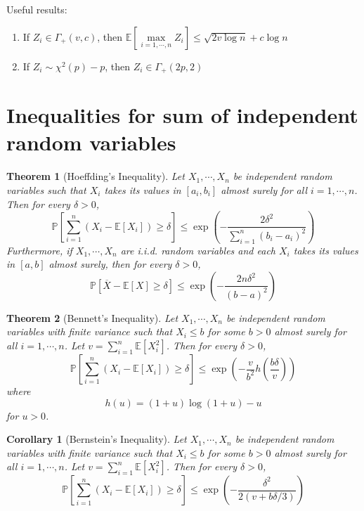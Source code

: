 \documentclass[10pt]{article}
\newcounter{lecnum}
\newtheorem{theorem}{Theorem}[lecnum]
\newtheorem{corollary}[cor]{Corollary}
\newcommand{\Expect}[1]{\mathbb{E}\!\left[#1\right]}
\renewcommand{\P}[1]{\mathbb{P}\!\left[#1\right]}
\renewcommand{\bar}{\overline}
\begin{document}
Useful results:
\begin{enumerate}
\item If $Z_i \in \Gamma_{+}(v, c)$, then $\Expect{\max\limits_{i=1, \cdots, n}Z_i} \le \sqrt{2v \log{n}} + c\log{n}$
\item If $Z_i \sim \chi^2(p) - p$, then $Z_i \in \Gamma_{+}(2p, 2)$
\end{enumerate}

\section{Inequalities for sum of independent random variables}

\begin{theorem}[Hoeffding's Inequality]
Let $X_1, \cdots, X_n$ be independent random variables such that $X_i$ takes its values in $[a_i, b_i]$
almost surely for all $i=1, \cdots, n$. Then for every $\delta > 0$,
\begin{equation}
\P{\sum_{i=1}^{n} (X_i - \Expect{X_i}) \ge \delta} \le \exp{(- \frac{2 \delta^2}{\sum_{i=1}^{n} (b_i - a_i)^2})} 
\end{equation}
Furthermore, if $X_1, \cdots, X_n$ are i.i.d. random variables and each $X_i$ takes its values in $[a, b]$
almost surely, then for every $\delta > 0$,
\begin{equation}
\label{equ:Hoeffding2}
\P{\bar{X} - \Expect{X} \ge \delta} \le \exp{(- \frac{2 n \delta^2}{(b - a)^2})}
\end{equation}
\end{theorem}


\begin{theorem}[Bennett's Inequality]
Let $X_1, \cdots, X_n$ be independent random variables with finite variance 
such that $X_i \le b$ for some $b > 0$
almost surely for all $i=1, \cdots, n$. 
Let $ v = \sum_{i=1}^{n} \Expect{X_i^2}$.
Then for every $\delta > 0$,
\begin{equation}
\P{\sum_{i=1}^{n} (X_i - \Expect{X_i}) \ge \delta} \le \exp{(- \frac{v}{b^2} h(\frac{b\delta}{v}))} 
\end{equation}
where
\begin{equation}
h(u) = (1+u) \log{(1+u)} -u
\end{equation}
for $u > 0$.
\end{theorem}

\begin{corollary}[Bernstein's Inequality]
Let $X_1, \cdots, X_n$ be independent random variables with finite variance 
such that $X_i \le b$ for some $b > 0$
almost surely for all $i=1, \cdots, n$. 
Let $ v = \sum_{i=1}^{n} \Expect{X_i^2}$.
Then for every $\delta > 0$,
\begin{equation}
\P{\sum_{i=1}^{n} (X_i - \Expect{X_i}) \ge \delta} \le \exp{(- \frac{\delta^2}{2(v + b\delta/3)} )} 
\end{equation}
\end{corollary}
\end{document}
